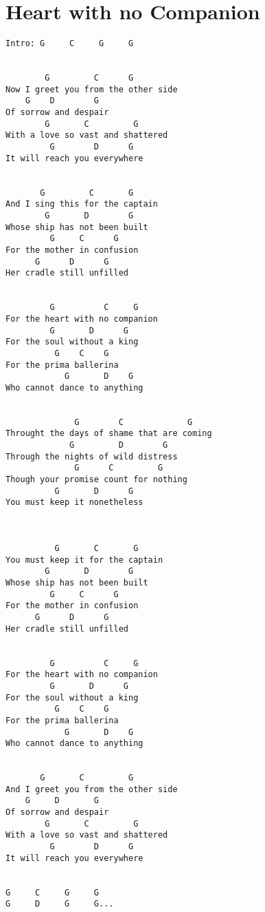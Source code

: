 \documentclass[leqno]{memoir}
\begin{document}
\chapter{Heart with no Companion}
\begin{verbatim}
Intro: G     C     G     G


        G         C      G
Now I greet you from the other side
    G    D        G
Of sorrow and despair
        G       C         G
With a love so vast and shattered
         G        D      G
It will reach you everywhere


       G         C       G
And I sing this for the captain
        G       D        G
Whose ship has not been built
         G     C      G
For the mother in confusion
      G      D      G
Her cradle still unfilled


         G          C     G
For the heart with no companion
         G       D      G
For the soul without a king
          G    C    G
For the prima ballerina
            G       D    G
Who cannot dance to anything


              G        C             G
Throught the days of shame that are coming
             G         D        G
Through the nights of wild distress
              G      C         G
Though your promise count for nothing
          G       D      G
You must keep it nonetheless



          G       C       G
You must keep it for the captain
        G       D        G
Whose ship has not been built
         G     C      G
For the mother in confusion
      G      D      G
Her cradle still unfilled


         G          C     G
For the heart with no companion
         G       D      G
For the soul without a king
          G    C    G
For the prima ballerina
            G       D    G
Who cannot dance to anything


       G       C         G
And I greet you from the other side
    G     D       G
Of sorrow and despair
        G       C         G
With a love so vast and shattered
         G        D      G
It will reach you everywhere


G     C     G     G
G     D     G     G...

\end{verbatim}
\newpage
\end{document}
